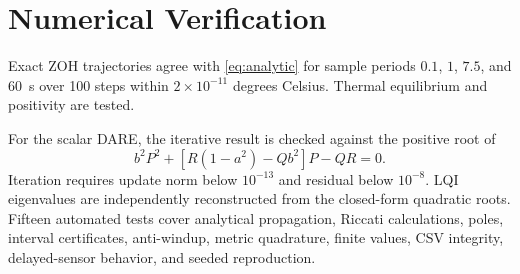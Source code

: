 \section{Numerical Verification}\label{sec:validation}
Exact ZOH trajectories agree with \cref{eq:analytic} for sample periods $0.1$, $1$, $7.5$, and \SI{60}{s} over 100 steps within $2\times10^{-11}$ degrees Celsius. Thermal equilibrium and positivity are tested.

For the scalar DARE, the iterative result is checked against the positive root of
\begin{equation}
b^2P^2+[R(1-a^2)-Qb^2]P-QR=0. \label{eq:scalar-dare}
\end{equation}
Iteration requires update norm below $10^{-13}$ and residual below $10^{-8}$. LQI eigenvalues are independently reconstructed from the closed-form quadratic roots. Fifteen automated tests cover analytical propagation, Riccati calculations, poles, interval certificates, anti-windup, metric quadrature, finite values, CSV integrity, delayed-sensor behavior, and seeded reproduction.

